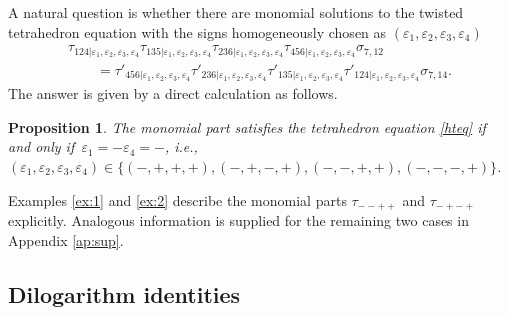 \documentclass[pdftex]{sigma}
\numberwithin{equation}{section}
\newtheorem{Proposition}[Theorem]{Proposition}
 { \theoremstyle{definition}
\newtheorem{Example}[Theorem]{Example}
\newtheorem{Remark}[Theorem]{Remark} }
\begin{document}
A natural question is whether there are monomial solutions to the twisted tetrahedron equation
with the signs homogeneously chosen as $(\varepsilon_1,\varepsilon_2,\varepsilon_3,\varepsilon_4)$
\begin{gather}
\tau_{124| \varepsilon_1,\varepsilon_2,\varepsilon_3,\varepsilon_4}
\tau_{135| \varepsilon_1,\varepsilon_2,\varepsilon_3,\varepsilon_4}
\tau_{236| \varepsilon_1,\varepsilon_2,\varepsilon_3,\varepsilon_4}
\tau_{456| \varepsilon_1,\varepsilon_2,\varepsilon_3,\varepsilon_4} \sigma_{7,12}\nonumber
\\
\qquad=
\tau'_{456| \varepsilon_1,\varepsilon_2,\varepsilon_3,\varepsilon_4}
\tau'_{236| \varepsilon_1,\varepsilon_2,\varepsilon_3,\varepsilon_4}
\tau'_{135| \varepsilon_1,\varepsilon_2,\varepsilon_3,\varepsilon_4}
\tau'_{124| \varepsilon_1,\varepsilon_2,\varepsilon_3,\varepsilon_4}\sigma_{7,14}.\label{hteq}
\end{gather}
The answer is given by a direct calculation as follows.
\begin{Proposition} \label{pr:mono}
The monomial part
satisfies the tetrahedron equation \eqref{hteq}
if and only if~${\varepsilon_1=-\varepsilon_4 = -}$, i.e.,
$(\varepsilon_1,\varepsilon_2,\varepsilon_3,\varepsilon_4) \in
\{(-,+,+,+), (-,+,-,+), (-,-,+,+), (-,-,-,+)\}$.
\end{Proposition}
Examples \ref{ex:1} and \ref{ex:2} describe the monomial parts
$\tau_{--++}$ and $\tau_{-+-+}$ explicitly.
Analogous information is supplied for the remaining two cases in Appendix \ref{ap:sup}.

\subsection{Dilogarithm identities}\label{ss:did}
\end{document}
